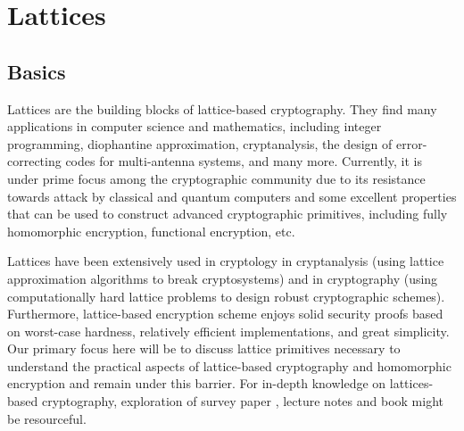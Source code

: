 
\chapter{Lattices}
\setcounter{section}{0}


\section{Basics}
Lattices are the building blocks of lattice-based cryptography.
They find many applications in computer science and mathematics, including integer programming, diophantine approximation, cryptanalysis, the design of error-correcting codes for multi-antenna systems, and many more.
Currently, it is under prime focus among the cryptographic community due to its resistance towards attack by classical and quantum computers and some excellent properties that can be used to construct advanced cryptographic primitives, including fully homomorphic encryption, functional encryption, etc.

Lattices have been extensively used in cryptology in cryptanalysis (using lattice approximation algorithms to break cryptosystems) and in cryptography (using computationally hard lattice problems to design robust cryptographic schemes).
Furthermore, lattice-based encryption scheme enjoys solid security proofs based on worst-case hardness, relatively efficient implementations, and great simplicity.
Our primary focus here will be to discuss lattice primitives necessary to understand the practical aspects of lattice-based cryptography and homomorphic encryption and remain under this barrier.
For in-depth knowledge on lattices-based cryptography, exploration of survey paper \cite{peikert2016decade,nguyen2001two,micciancio2009lattice,peikert2016decade,regev2006lattice}, lecture notes \cite{MicciancioLN,regevlatticenotes,Vinodlatticenotes} and book \cite{MGbook} might be resourceful.

